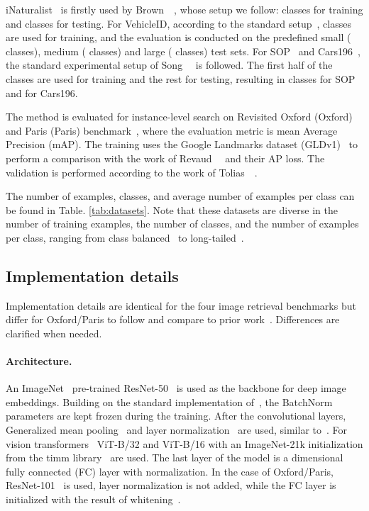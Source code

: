 iNaturalist~\cite{vms+18} is firstly used by Brown~\etal~\cite{bxk+20}, whose setup we follow:  classes for training and  classes for testing. For VehicleID, according to the standard setup~\cite{ltw+16},  classes are used for training, and the evaluation is conducted on the predefined small ( classes), medium ( classes) and large ( classes) test sets. For SOP~\cite{ohb16} and Cars196~\cite{ksd+13}, the standard experimental setup of Song~\etal~\cite{sxj+15} is followed. The first half of the classes are used for training and the rest for testing, resulting in  classes for SOP and  for Cars196.

The method is evaluated for instance-level search on Revisited Oxford (Oxford) and Paris (Paris) benchmark~\cite{rit+18}, where the evaluation metric is mean Average Precision (mAP). The training uses the Google Landmarks dataset (GLDv1)~\cite{nas+17} to perform a comparison with the work of Revaud~\etal~\cite{rar+19} and their AP loss. The validation is performed according to the work of Tolias~\etal~\cite{tjc20}. 

The number of examples, classes, and average number of examples per class can be found in Table. \ref{tab:datasets}. Note that these datasets are diverse in the number of training examples, the number of classes, and the number of examples per class, ranging from class balanced~\cite{ksd+13} to long-tailed~\cite{vms+18}.



\subsection{Implementation details}
\label{sec:implementation_details}

Implementation details are identical for the four image retrieval benchmarks but differ for  Oxford/Paris to follow and compare to prior work~\cite{rar+19}. Differences are clarified when needed.

\paragraph{Architecture.} An ImageNet~\cite{dsl+09} pre-trained ResNet-50~\cite{hzr+16} is used as the backbone for deep image embeddings. Building on the standard implementation of~\cite{rms+20}, the BatchNorm parameters are kept frozen during the training. After the convolutional layers, Generalized mean pooling~\cite{rtc19} and layer normalization~\cite{bkh+16} are used,  similar to~\cite{tdt20}. For vision transformers~\cite{dbk+21} ViT-B/32 and ViT-B/16 with an ImageNet-21k initialization from the timm library~\cite{rw2019timm} are used. The last layer of the model is a  dimensional fully connected (FC) layer with  normalization. In the case of Oxford/Paris, ResNet-101~\cite{hzr+16} is used, layer normalization is not added, while the FC layer is initialized with the result of whitening~\cite{rtc19}.

